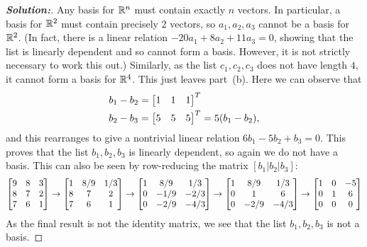 \documentclass[a4paper]{amsart}
\theoremstyle{definition}
\newenvironment{solution}{\begin{proof}[\textbf{Solution:}] \vphantom{u}}{\end{proof}}
\begin{document}
\begin{solution}
 Any basis for ${\mathbb{R}}^n$ must contain exactly $n$ vectors.  In
 particular, a basis for ${\mathbb{R}}^2$ must contain precisely $2$ vectors, so
 $a_1,a_2,a_3$ cannot be a basis for ${\mathbb{R}}^2$.  (In fact, there is a
 linear relation $-20a_1+8a_2+11a_3=0$, showing that the list is
 linearly dependent and so cannot form a basis.  However, it is not
 strictly necessary to work this out.)  Similarly, as the list
 $c_1,c_2,c_3$ does not have length $4$, it cannot form a basis for
 ${\mathbb{R}}^4$.  This just leaves part~(b).  Here we can observe that
 \begin{align*} 
  b_1-b_2 &= \left[\begin{matrix} 1&1&1\end{matrix}\right]^T \\
  b_2-b_3 &= \left[\begin{matrix} 5&5&5\end{matrix}\right]^T = 5(b_1-b_2),
 \end{align*}
 and this rearranges to give a nontrivial linear relation
 $6b_1-5b_2+b_3=0$.  This proves that the list $b_1,b_2,b_3$ is
 linearly dependent, so again we do not have a basis.  This can also
 be seen by row-reducing the matrix $[b_1|b_2|b_3]$:
 \[ 
  \left[\begin{matrix} 9 & 8 & 3 \\
       8 & 7 & 2 \\
       7 & 6 & 1 \end{matrix}\right] \to
  \left[\begin{matrix} 1 & 8/9 & 1/3 \\
       8 &   7 &   2 \\ 
       7 &   6 &   1 \end{matrix}\right] \to
  \left[\begin{matrix} 1 &  8/9 &  1/3 \\
       0 & -1/9 & -2/3 \\ 
       0 & -2/9 & -4/3 \end{matrix}\right] \to
  \left[\begin{matrix} 1 &  8/9 &  1/3 \\
       0 &    1 &    6 \\ 
       0 & -2/9 & -4/3 \end{matrix}\right] \to
  \left[\begin{matrix} 1 &    0 &  -5 \\
       0 &    1 &   6 \\ 
       0 &    0 &   0 \end{matrix}\right]
 \]
 As the final result is not the identity matrix, we see that the list
 $b_1,b_2,b_3$ is not a basis.
\end{solution}
\end{document}
